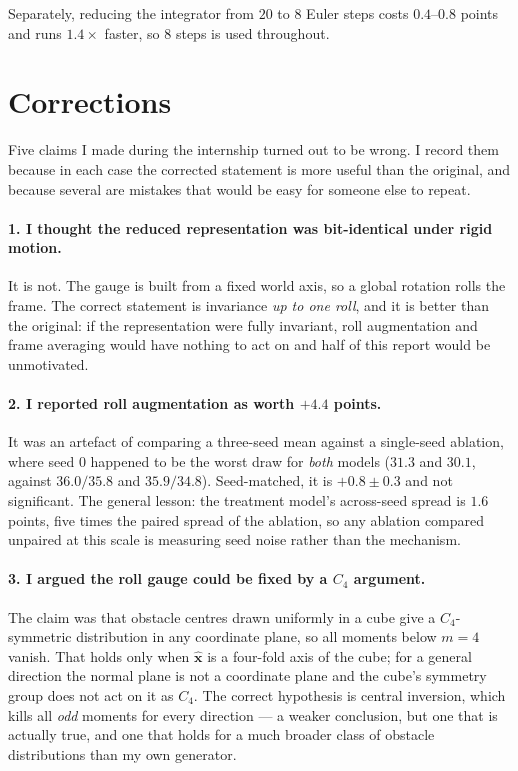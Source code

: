 \documentclass[11pt,a4paper]{article}
\newcommand{\xhat}{\hat{\mathbf{x}}}
\begin{document}
Separately, reducing the integrator from $20$ to $8$ Euler steps costs $0.4$--$0.8$
points and runs $1.4\times$ faster, so $8$ steps is used throughout.

\section{Corrections}
\label{sec:corrections}

Five claims I made during the internship turned out to be wrong. I record them
because in each case the corrected statement is more useful than the original,
and because several are mistakes that would be easy for someone else to repeat.

\paragraph{1. I thought the reduced representation was bit-identical under rigid
motion.} It is not. The gauge is built from a fixed world axis, so a global
rotation rolls the frame. The correct statement is invariance \emph{up to one
roll}, and it is better than the original: if the representation were fully
invariant, roll augmentation and frame averaging would have nothing to act on and
half of this report would be unmotivated.

\paragraph{2. I reported roll augmentation as worth $+4.4$ points.} It was an
artefact of comparing a three-seed mean against a single-seed ablation, where
seed $0$ happened to be the worst draw for \emph{both} models ($31.3$ and $30.1$,
against $36.0/35.8$ and $35.9/34.8$). Seed-matched, it is $+0.8 \pm 0.3$ and not
significant. The general lesson: the treatment model's across-seed spread is $1.6$
points, five times the paired spread of the ablation, so any ablation compared
unpaired at this scale is measuring seed noise rather than the mechanism.

\paragraph{3. I argued the roll gauge could be fixed by a $C_4$ argument.} The
claim was that obstacle centres drawn uniformly in a cube give a $C_4$-symmetric
distribution in any coordinate plane, so all moments below $m=4$ vanish. That
holds only when $\xhat$ is a four-fold axis of the cube; for a general direction
the normal plane is not a coordinate plane and the cube's symmetry group does not
act on it as $C_4$. The correct hypothesis is central inversion, which kills all
\emph{odd} moments for every direction --- a weaker conclusion, but one that is
actually true, and one that holds for a much broader class of obstacle
distributions than my own generator.
\end{document}
